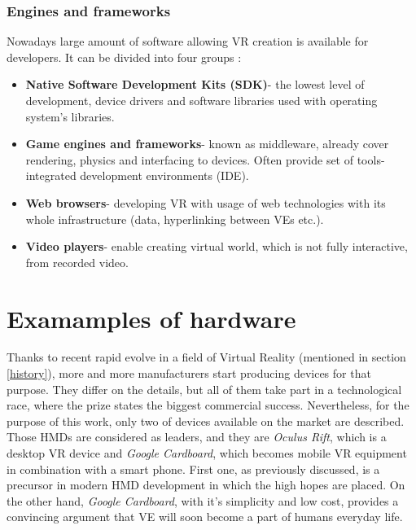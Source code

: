 \subsubsection{Engines and frameworks}
Nowadays large amount of software allowing VR creation is available for developers. It can be divided into four groups \cite{Parisi15}:
\begin{itemize}
\item \textbf{Native Software Development Kits (SDK)}- the lowest level of development, device drivers and software libraries used with operating system's libraries.  
\item \textbf{Game engines and frameworks}- known as middleware, already cover rendering, physics and interfacing to devices. Often provide set of tools- integrated development environments (IDE). 
\item \textbf{Web browsers}- developing VR with usage of web technologies with its whole infrastructure (data, hyperlinking between VEs etc.).
\item \textbf{Video players}- enable creating virtual world, which is not fully interactive, from recorded video.
\end{itemize}


\section{Examamples of hardware}\label{dev}%
Thanks to recent rapid evolve in a field of Virtual Reality (mentioned in section \ref{history}), more and more manufacturers start producing devices for that purpose. They differ on the details, but all of them take part in a technological race, where the prize states the biggest commercial success.  Nevertheless, for the purpose of this work, only two of devices available on the market are described. Those HMDs are considered as leaders, and they are \textit{Oculus Rift}, which is a desktop VR device and \textit{Google Cardboard}, which becomes mobile VR equipment in combination with a smart phone. First one, as previously discussed, is a precursor in modern HMD development in which the high hopes are placed. On the other hand, \textit{Google Cardboard}, with it's simplicity and low cost, provides a convincing argument that VE will soon become a part of humans everyday life.
 
